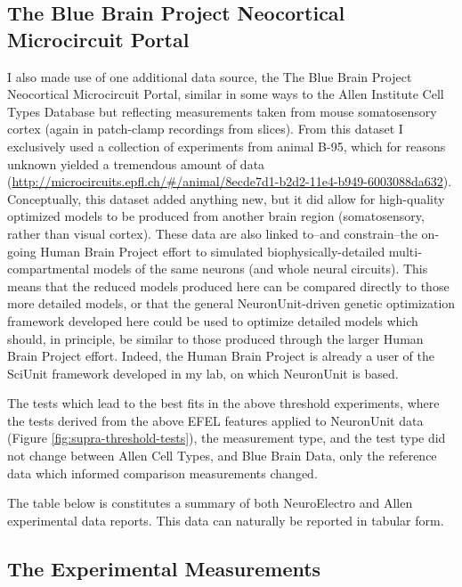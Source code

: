 \subsection{The Blue Brain Project Neocortical Microcircuit Portal}
\label{sec:bluebrain-data}
I also made use of one additional data source, the The Blue Brain Project Neocortical Microcircuit Portal, similar in some ways to the Allen Institute Cell Types Database but reflecting measurements taken from mouse somatosensory cortex (again in patch-clamp recordings from slices).
From this dataset I exclusively used a collection of experiments from animal B-95, which for reasons unknown yielded a tremendous amount of data (\url{http://microcircuits.epfl.ch/#/animal/8ecde7d1-b2d2-11e4-b949-6003088da632}).
Conceptually, this dataset added anything new, but it did allow for high-quality optimized models to be produced from another brain region (somatosensory, rather than visual cortex).
These data are also linked to--and constrain--the on-going Human Brain Project effort to simulated biophysically-detailed multi-compartmental models of the same neurons (and whole neural circuits).
This means that the reduced models produced here can be compared directly to those more detailed models, or that the general NeuronUnit-driven genetic optimization framework developed here could be used to optimize detailed models which should, in principle, be similar to those produced through the larger Human Brain Project effort.
Indeed, the Human Brain Project is already a user of the SciUnit framework developed in my lab, on which NeuronUnit is based.

The tests which lead to the best fits in the above threshold experiments, where the tests derived from the above EFEL features applied to NeuronUnit data (Figure \ref{fig:supra-threshold-tests}), the measurement type, and the test type did not change between Allen Cell Types, and Blue Brain Data, only the reference data which informed comparison measurements changed.

The table below is constitutes a summary of both NeuroElectro and Allen experimental data reports. This data can naturally be reported in tabular form. 

\subsection{The Experimental Measurements}

